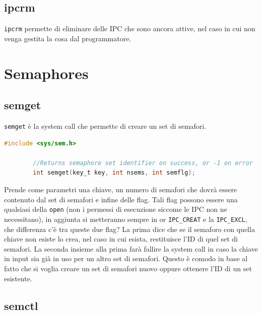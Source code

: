 \documentclass[a4paper, 12pt]{book}
\begin{document}
    \subsection{ipcrm}

    \verb|ipcrm| permette di eliminare delle IPC che sono 
    ancora attive, nel caso in cui non venga gestita la cosa 
    dal programmatore.

    \section{Semaphores}

    \subsection{semget}

    \verb|semget| è la system call che permette di creare 
    un set di semafori.
    \begin{lstlisting}[language=C]
        #include <sys/sem.h>

        //Returns semaphore set identifier on success, or -1 on error 
        int semget(key_t key, int nsems, int semflg);
    \end{lstlisting}
    Prende come parametri una chiave, un numero di semafori 
    che dovrà essere contenuto dal set di semafori e infine 
     delle flag. Tali flag possono essere 
    una qualsiasi della \verb|open| (non i permessi di 
    esecuzione siccome le IPC non ne necessitano), in aggiunta 
    si metteranno sempre in or \verb|IPC_CREAT| e la 
    \verb|IPC_EXCL|, che differenza c'è tra queste due flag? 
    La prima dice che se il semaforo con quella chiave non 
    esiste lo crea, nel caso in cui esista, restituisce 
    l'ID di quel set di semafori. La seconda insieme alla prima
    farà fallire la system call in caso la chiave in input sia 
    già in uso per un altro set di semafori. Questo è comodo 
    in base al fatto che si voglia creare un set di semafori nuovo 
    oppure ottenere l'ID di un set esistente.

    \subsection{semctl}
\end{document}
